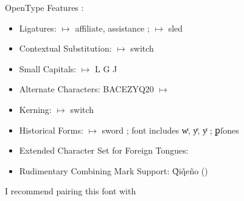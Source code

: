 \documentclass[border=15pt]{standalone}
\begin{document}
\begin{minipage}{4in}
OpenType Features :
    \begin{itemize}
        \item Ligatures: {} $\mapsto$ a{\color{BrickRed}ffi}liate, a{\color{BrickRed}ssi}stance ; {} $\mapsto$ {\color{BrickRed}sl}ed
\item Contextual Substitution: {} $\mapsto$ switch
\item Small Capitals: {} $\mapsto$ {L{} G{} J{}}
\item Alternate Characters: BACEZYQ20 $\mapsto$ {}
\item Kerning: {} $\mapsto$ switch
\item Historical Forms: {} $\mapsto$ sword ; font includes wͭ, yͤ, yͭ ; ꝑſones
\item Extended Character Set for Foreign Tongues: {\color{BrickRed}}
\item Rudimentary Combining Mark Support: Q̃iq̃eño ({})
    \end{itemize}
    I recommend pairing this font with {}
\end{minipage}
\end{document}
